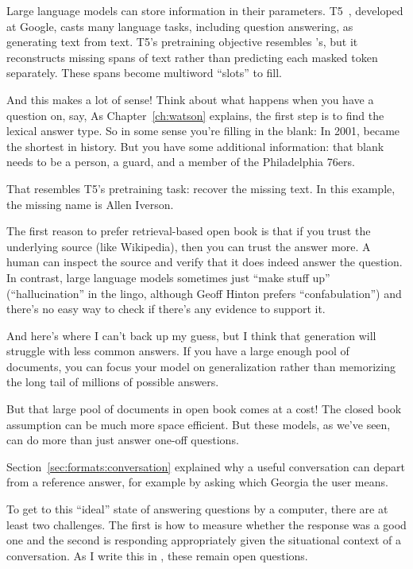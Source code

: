 Large language models can store information in their parameters.  T5~\citep{raffel-20}, developed at Google, casts many language tasks, including question answering, as generating text from text.
T5's pretraining objective resembles 's, but it reconstructs missing spans of text rather than predicting each masked token separately.  These spans become multiword ``slots'' to fill.

And this makes a lot of sense!  Think about what happens when you have a question on, say, \jeopardyf{}  As Chapter~\ref{ch:watson} explains, the first step is to find the lexical answer type.  So in some sense you're filling in the blank: In 2001, \underline{\hspace{2cm}} became the shortest   in history.  But you have some additional information: that blank needs to be a person, a guard, and a member of the Philadelphia 76ers.

That resembles T5's pretraining task: recover the missing text.  In this example, the missing name is Allen Iverson.

The first reason to prefer retrieval-based open book  is that if you trust the underlying source (like Wikipedia), then you can trust the answer more.  A human can inspect the source and verify that it does indeed answer the question.  In contrast, large language models sometimes just ``make stuff up'' (``hallucination'' in the lingo, although Geoff Hinton prefers ``confabulation'') and there's no easy way to check if there's any evidence to support it.

And here's where I can't back up my guess, but I think that generation will struggle with less common answers.  If you have a large enough pool of documents, you can focus your model on generalization rather than memorizing the long tail of millions of possible answers.

But that large pool of documents in open book  comes at a cost!  The closed book assumption can be much more space efficient.  But these models, as we've seen, can do more than just answer one-off questions.  


Section~\ref{sec:formats:conversation} explained why a useful conversation can depart from a reference answer, for example by asking which Georgia the user means.

To get to this ``ideal'' state of answering questions by a computer, there are at least two challenges.  The first is how to measure whether the response was a good one and the second is responding appropriately given the situational context of a conversation.  As I write this in \currentyear{}, these remain open questions.


